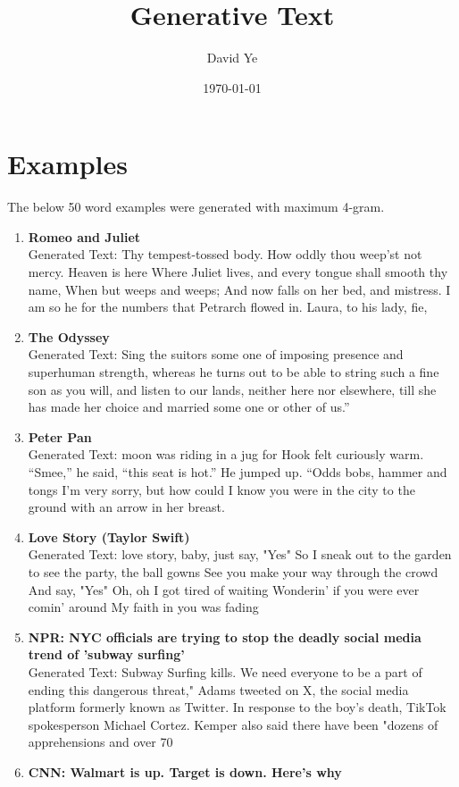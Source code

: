 \documentclass[11pt]{article}
\title{Generative Text}
\author{David Ye}
\date{\today}
\begin{document}
\maketitle
\section{Examples}
The below 50 word examples were generated with maximum 4-gram. 
\begin{enumerate}
  \item \textbf{Romeo and Juliet}\\
  Generated Text: Thy tempest-tossed body. How oddly thou weep’st not mercy. Heaven is here Where Juliet lives, and every tongue shall smooth thy name, When but weeps and weeps; And now falls on her bed, and mistress. I am so he for the numbers that Petrarch flowed in. Laura, to his lady, fie,
  \item \textbf{The Odyssey}\\
  Generated Text: Sing the suitors some one of imposing presence and superhuman strength, whereas he turns out to be able to string such a fine son as you will, and listen to our lands, neither here nor elsewhere, till she has made her choice and married some one or other of us.”
  \item \textbf{Peter Pan}\\
  Generated Text: moon was riding in a jug for Hook felt curiously warm. “Smee,” he said, “this seat is hot.” He jumped up. “Odds bobs, hammer and tongs I’m very sorry, but how could I know you were in the city to the ground with an arrow in her breast.
  \item \textbf{Love Story (Taylor Swift)}\\
  Generated Text: love story, baby, just say, "Yes" So I sneak out to the garden to see the party, the ball gowns See you make your way through the crowd And say, "Yes" Oh, oh I got tired of waiting Wonderin' if you were ever comin' around My faith in you was fading
  \item \textbf{NPR: NYC officials are trying to stop the deadly social media trend of 'subway surfing'}\\
  Generated Text: Subway Surfing kills. We need everyone to be a part of ending this dangerous threat," Adams tweeted on X, the social media platform formerly known as Twitter.  In response to the boy's death, TikTok spokesperson Michael Cortez.  Kemper also said there have been "dozens of apprehensions and over 70
  \item \textbf{CNN: Walmart is up. Target is down. Here’s why}\\

\end{enumerate}
\end{document}

